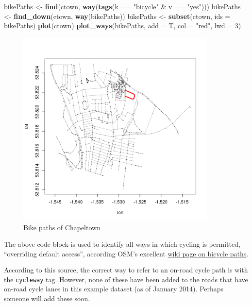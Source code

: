 \documentclass[]{article}
\newenvironment{Shaded}{}{}
\newcommand{\KeywordTok}[1]{\textcolor[rgb]{0.00,0.44,0.13}{\textbf{{#1}}}}
\newcommand{\DataTypeTok}[1]{\textcolor[rgb]{0.56,0.13,0.00}{{#1}}}
\newcommand{\DecValTok}[1]{\textcolor[rgb]{0.25,0.63,0.44}{{#1}}}
\newcommand{\StringTok}[1]{\textcolor[rgb]{0.25,0.44,0.63}{{#1}}}
\newcommand{\NormalTok}[1]{{#1}}
\let\Oldincludegraphics\includegraphics
\renewcommand{\includegraphics}[1]{\Oldincludegraphics[width=10cm]{#1}}
\begin{document}
\begin{Shaded}
\begin{Highlighting}[]
\NormalTok{bikePaths <- }\KeywordTok{find}\NormalTok{(ctown, }\KeywordTok{way}\NormalTok{(}\KeywordTok{tags}\NormalTok{(k == }\StringTok{"bicycle"} \NormalTok{& v == }\StringTok{"yes"}\NormalTok{)))}
\NormalTok{bikePaths <- }\KeywordTok{find_down}\NormalTok{(ctown, }\KeywordTok{way}\NormalTok{(bikePaths))}
\NormalTok{bikePaths <- }\KeywordTok{subset}\NormalTok{(ctown, }\DataTypeTok{ids =} \NormalTok{bikePaths)}
\KeywordTok{plot}\NormalTok{(ctown)}
\KeywordTok{plot_ways}\NormalTok{(bikePaths, }\DataTypeTok{add =} \NormalTok{T, }\DataTypeTok{col =} \StringTok{"red"}\NormalTok{, }\DataTypeTok{lwd =} \DecValTok{3}\NormalTok{)}
\end{Highlighting}
\end{Shaded}
\begin{figure}[htbp]
\centering
\includegraphics{figure/Bike_paths_of_Chapeltown.png}
\caption{Bike paths of Chapeltown}
\end{figure}

The above code block is used to identify all ways in which cycling is
permitted, ``overriding default access'', according OSM's excellent
\href{http://wiki.openstreetmap.org/wiki/Bicycle}{wiki page on bicycle
paths}.

According to this source, the correct way to refer to an on-road cycle
path is with the \texttt{cycleway} tag. However, none of these have been
added to the roads that have on-road cycle lanes in this example dataset
(as of January 2014). Perhaps someone will add these soon.
\end{document}
